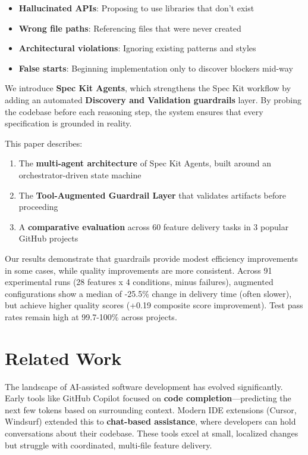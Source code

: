 \documentclass[sigconf,anonymous,review]{acmart}
\begin{document}
\begin{itemize}
  \item \textbf{Hallucinated APIs}: Proposing to use libraries that don't exist
  \item \textbf{Wrong file paths}: Referencing files that were never created
  \item \textbf{Architectural violations}: Ignoring existing patterns and styles
  \item \textbf{False starts}: Beginning implementation only to discover blockers mid-way
\end{itemize}

We introduce \textbf{Spec Kit Agents}, which strengthens the Spec Kit workflow by adding an automated \textbf{Discovery and Validation guardrails} layer. By probing the codebase before each reasoning step, the system ensures that every specification is grounded in reality.

This paper describes:

\begin{enumerate}
  \item The \textbf{multi-agent architecture} of Spec Kit Agents, built around an orchestrator-driven state machine
  \item The \textbf{Tool-Augmented Guardrail Layer} that validates artifacts before proceeding
  \item A \textbf{comparative evaluation} across 60 feature delivery tasks in 3 popular GitHub projects
\end{enumerate}

Our results demonstrate that guardrails provide modest efficiency improvements in some cases, while quality improvements are more consistent. Across 91 experimental runs (28 features x 4 conditions, minus failures), augmented configurations show a median of -25.5\% change in delivery time (often slower), but achieve higher quality scores (+0.19 composite score improvement). Test pass rates remain high at 99.7-100\% across projects.

\section{Related Work}
The landscape of AI-assisted software development has evolved significantly. Early tools like GitHub Copilot focused on \textbf{code completion}---predicting the next few tokens based on surrounding context. Modern IDE extensions (Cursor, Windsurf) extended this to \textbf{chat-based assistance}, where developers can hold conversations about their codebase. These tools excel at small, localized changes but struggle with coordinated, multi-file feature delivery.
\end{document}
